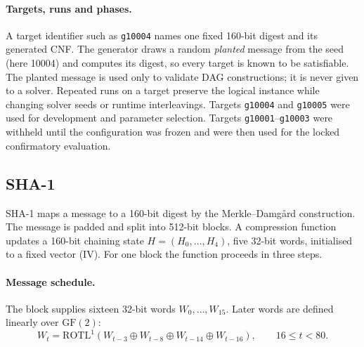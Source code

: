 \documentclass[11pt,a4paper]{article}
\newcommand{\rotl}[1]{\mathrm{ROTL}^{#1}}
\begin{document}
\paragraph{Targets, runs and phases.}
A target identifier such as \texttt{g10004} names one fixed 160-bit digest and its generated CNF.
The generator draws a random \emph{planted} message from the seed (here 10004) and computes its
digest, so every target is known to be satisfiable. The planted message is used only to validate DAG
constructions; it is never given to a solver.
Repeated runs on a target preserve the logical instance while changing solver seeds or runtime
interleavings. Targets \texttt{g10004} and \texttt{g10005} were used for development and parameter
selection. Targets \texttt{g10001}--\texttt{g10003} were withheld until the configuration was frozen
and were then used for the locked confirmatory evaluation.


\subsection{SHA-1}

SHA-1 \cite{fips180} maps a message to a 160-bit digest by the Merkle--Damg{\aa}rd construction.
The message is padded and split into 512-bit blocks. A compression function updates a 160-bit
chaining state $H=(H_0,\dots,H_4)$, five 32-bit words, initialised to a fixed vector (IV). For one
block the function proceeds in three steps.

\paragraph{Message schedule.} The block supplies sixteen 32-bit words $W_0,\dots,W_{15}$. Later
words are defined linearly over $\mathrm{GF}(2)$:
\begin{equation}
W_t=\rotl{1}\!\left(W_{t-3}\oplus W_{t-8}\oplus W_{t-14}\oplus W_{t-16}\right),\qquad 16\le t<80.
\end{equation}
\end{document}
